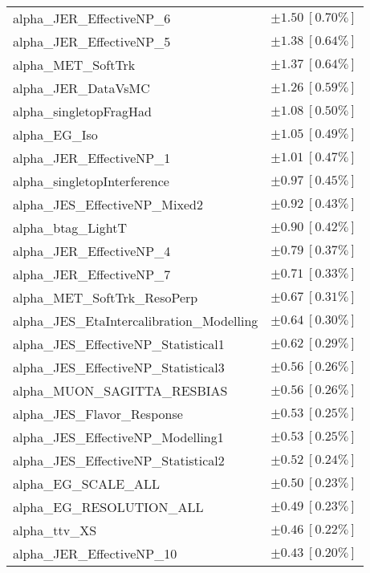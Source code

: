 \begin{table}
\begin{center}
\begin{tabular*}{\textwidth}{@{\extracolsep{\fill}}lc}
alpha\_JER\_EffectiveNP\_6         & $\pm 1.50\ [0.70\%] $       \\
alpha\_JER\_EffectiveNP\_5         & $\pm 1.38\ [0.64\%] $       \\
alpha\_MET\_SoftTrk         & $\pm 1.37\ [0.64\%] $       \\
alpha\_JER\_DataVsMC         & $\pm 1.26\ [0.59\%] $       \\
alpha\_singletopFragHad         & $\pm 1.08\ [0.50\%] $       \\
alpha\_EG\_Iso         & $\pm 1.05\ [0.49\%] $       \\
alpha\_JER\_EffectiveNP\_1         & $\pm 1.01\ [0.47\%] $       \\
alpha\_singletopInterference         & $\pm 0.97\ [0.45\%] $       \\
alpha\_JES\_EffectiveNP\_Mixed2         & $\pm 0.92\ [0.43\%] $       \\
alpha\_btag\_LightT         & $\pm 0.90\ [0.42\%] $       \\
alpha\_JER\_EffectiveNP\_4         & $\pm 0.79\ [0.37\%] $       \\
alpha\_JER\_EffectiveNP\_7         & $\pm 0.71\ [0.33\%] $       \\
alpha\_MET\_SoftTrk\_ResoPerp         & $\pm 0.67\ [0.31\%] $       \\
alpha\_JES\_EtaIntercalibration\_Modelling         & $\pm 0.64\ [0.30\%] $       \\
alpha\_JES\_EffectiveNP\_Statistical1         & $\pm 0.62\ [0.29\%] $       \\
alpha\_JES\_EffectiveNP\_Statistical3         & $\pm 0.56\ [0.26\%] $       \\
alpha\_MUON\_SAGITTA\_RESBIAS         & $\pm 0.56\ [0.26\%] $       \\
alpha\_JES\_Flavor\_Response         & $\pm 0.53\ [0.25\%] $       \\
alpha\_JES\_EffectiveNP\_Modelling1         & $\pm 0.53\ [0.25\%] $       \\
alpha\_JES\_EffectiveNP\_Statistical2         & $\pm 0.52\ [0.24\%] $       \\
alpha\_EG\_SCALE\_ALL         & $\pm 0.50\ [0.23\%] $       \\
alpha\_EG\_RESOLUTION\_ALL         & $\pm 0.49\ [0.23\%] $       \\
alpha\_ttv\_XS         & $\pm 0.46\ [0.22\%] $       \\
alpha\_JER\_EffectiveNP\_10         & $\pm 0.43\ [0.20\%] $       \\

\end{tabular*}
\end{center}
\end{table}
